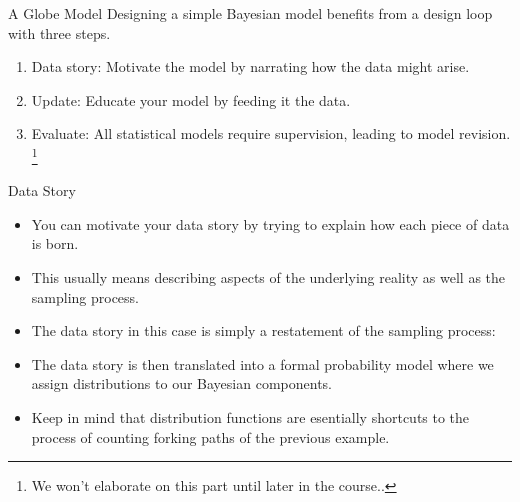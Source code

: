 \documentclass[handout]{beamer}
\begin{document}
\begin{frame}{A Globe Model}
Designing a simple Bayesian model benefits from a design loop with three steps.
\begin{enumerate}
 \item Data story: Motivate the model by narrating how the data might arise.
\item Update: Educate your model by feeding it the data.
\item Evaluate: All statistical models require supervision, leading to model revision. \footnote{We won't elaborate on this part until later in the course..}
\end{enumerate}

\end{frame}



\begin{frame}{Data Story}
\scriptsize{
\begin{itemize}
\item You can motivate your data story by trying to explain how each piece of data is born. 
\item This usually means describing aspects of the underlying reality as well as the sampling process.
\item The data story in this case is simply a restatement of the sampling process:


\item The data story is then translated into a formal probability model where we assign distributions to our Bayesian components.
\item Keep in mind that distribution functions are esentially shortcuts to the process of counting forking paths of the previous example.
\end{itemize}




} 
 
 

\end{frame}
\end{document}
